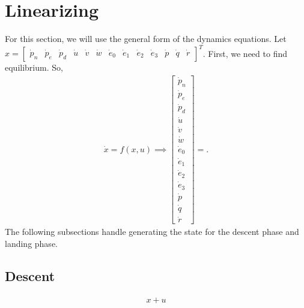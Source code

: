 \documentclass[11pt]{article}
\newcommand{\mathse}[1]{\begin{gather*}#1\end{gather*}}
\newcommand{\mat}[1]{\begin{bmatrix} #1 \end{bmatrix}}
\newcommand{\sinput}[1]{}
\begin{document}
\section{Linearizing}
For this section, we will use the general form of the dynamics equations. Let $x = \mat{\dot{p}_n & \dot{p}_e & \dot{p}_d & \dot{u} & \dot{v} & \dot{w} & \dot{e}_0 & \dot{e}_1 & \dot{e}_2 & \dot{e}_3 & \dot{p} & \dot{q} & \dot{r}}^T$. First, we need to find equilibrium. So,
\mathse{
    \dot{x} = f(x, u) \implies \mat{\dot{p}_n\\ \dot{p}_e\\ \dot{p}_d\\ \dot{u}\\ \dot{v}\\ \dot{w}\\ \dot{e}_0\\ \dot{e}_1\\ \dot{e}_2\\ \dot{e}_3\\ \dot{p}\\ \dot{q}\\ \dot{r}} = \sinput{f_x_u}.
}
The following subsections handle generating the state for the descent phase and landing phase.
\subsection{Descent}

{\tiny
\mathse{
    \sinput{A}x + \sinput{B}u
}
}
\end{document}
